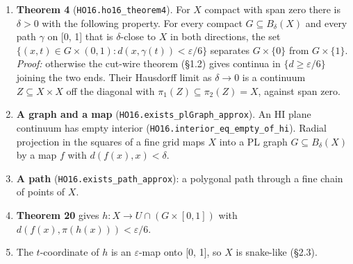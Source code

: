 \documentclass[11pt]{article}
\newcommand{\lean}[1]{\texttt{#1}}
\begin{document}
\begin{enumerate}
  \item[1.] \textbf{Theorem 4} (\lean{HO16.\hspace{0pt}ho16\_\hspace{0pt}theorem4}). For $X$ compact with span zero there is $\delta > 0$ with the following property. For every compact $G \subseteq B_{\delta}(X)$ and every path $\gamma$ on [0, 1] that is $\delta$-close to $X$ in both directions, the set $\{(x, t) \in G \times (0, 1) : d(x, \gamma (t)) < \varepsilon /6\}$ separates $G \times \{0\}$ from $G \times \{1\}$. \emph{Proof:} otherwise the cut-wire theorem (\S{}1.2) gives continua in $\{d \geq \varepsilon /6\}$ joining the two ends. Their Hausdorff limit as $\delta \to 0$ is a continuum $Z \subseteq X \times X$ off the diagonal with $\pi_1(Z) \subseteq \pi_2(Z) = X$, against span zero.
  \item[2.] \textbf{A graph and a map} (\lean{HO16.\hspace{0pt}exists\_\hspace{0pt}plGraph\_\hspace{0pt}approx}). An HI plane continuum has empty interior (\lean{HO16.\hspace{0pt}interior\_\hspace{0pt}eq\_\hspace{0pt}empty\_\hspace{0pt}of\_\hspace{0pt}hi}). Radial projection in the squares of a fine grid maps $X$ into a PL graph $G \subseteq B_{\delta}(X)$ by a map $f$ with $d(f(x), x) < \delta$.
  \item[3.] \textbf{A path} (\lean{HO16.\hspace{0pt}exists\_\hspace{0pt}path\_\hspace{0pt}approx}): a polygonal path through a fine chain of points of $X$.
  \item[4.] \textbf{Theorem 20} gives $h : X \to U \cap (G \times [0, 1])$ with $d(f(x), \pi (h(x))) < \varepsilon /6$.
  \item[5.] The $t$-coordinate of $h$ is an $\varepsilon$-map onto [0, 1], so $X$ is snake-like (\S{}2.3).
\end{enumerate}
\end{document}
